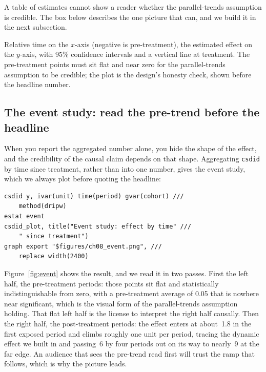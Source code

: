 A table of estimates cannot show a reader whether the parallel-trends assumption is credible. The box below describes the one picture that can, and we build it in the next subsection.

\begin{vizcallout}
Relative time on the $x$-axis (negative is pre-treatment), the estimated effect on the $y$-axis, with 95\% confidence intervals and a vertical line at treatment. The pre-treatment points must sit flat and near zero for the parallel-trends assumption to be credible; the plot is the design's honesty check, shown before the headline number.
\end{vizcallout}

\subsection{The event study: read the pre-trend before the headline}
When you report the aggregated number alone, you hide the shape of the effect, and the credibility of the causal claim depends on that shape. Aggregating \texttt{csdid} by time since treatment, rather than into one number, gives the event study, which we always plot before quoting the headline:
\par
{\footnotesize
\begin{verbatim}
csdid y, ivar(unit) time(period) gvar(cohort) ///
    method(dripw)
estat event
csdid_plot, title("Event study: effect by time" ///
    " since treatment")
graph export "$figures/ch08_event.png", ///
    replace width(2400)
\end{verbatim}
}
Figure~\ref{fig:event} shows the result, and we read it in two passes. First the left half, the pre-treatment periods: those points sit flat and statistically indistinguishable from zero, with a pre-treatment average of 0.05 that is nowhere near significant, which is the visual form of the parallel-trends assumption holding. That flat left half is the license to interpret the right half causally. Then the right half, the post-treatment periods: the effect enters at about~1.8 in the first exposed period and climbs roughly one unit per period, tracing the dynamic effect we built in and passing~6 by four periods out on its way to nearly~9 at the far edge. An audience that sees the pre-trend read first will trust the ramp that follows, which is why the picture leads.

